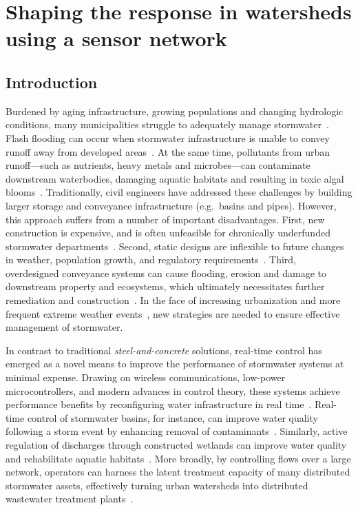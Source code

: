 \chapter{Shaping the response in watersheds using a sensor network}\label{ch:shaping}
\section{Introduction}

Burdened by aging infrastructure, growing populations and changing hydrologic conditions, many municipalities struggle to adequately manage stormwater~\cite{Kerkez_2016}.
Flash flooding can occur when stormwater infrastructure is unable to convey runoff away from developed areas~\cite{Wright_2017}.
At the same time, pollutants from urban runoff---such as nutrients, heavy metals and microbes---can contaminate downstream waterbodies, damaging aquatic habitats and resulting in toxic algal blooms~\cite{Kerkez_2016}. Traditionally, civil engineers have addressed these challenges by building larger storage and conveyance infrastructure (e.g.\ basins and pipes). However, this approach suffers from a number of important disadvantages. First, new construction is expensive, and is often unfeasible for chronically underfunded stormwater departments~\cite{Montestruque_2015}. Second, static designs are inflexible to future changes in weather, population growth, and regulatory requirements~\cite{Wright_2017}. Third, overdesigned conveyance systems can cause flooding, erosion and damage to downstream property and ecosystems, which ultimately necessitates further remediation and construction~\cite{Kerkez_2016}. In the face of increasing urbanization and more frequent extreme weather events~\cite{Bronstert_2002, stocker_2014}, new strategies are needed to ensure effective management of stormwater.

In contrast to traditional \textit{steel-and-concrete} solutions, real-time control has emerged as a novel means to improve the performance of stormwater systems at minimal expense. Drawing on wireless communications, low-power microcontrollers, and modern advances in control theory, these systems achieve performance benefits by reconfiguring water infrastructure in real time~\cite{Bartos_2018, Kerkez_2016}. Real-time control of stormwater basins, for instance, can improve water quality following a storm event by enhancing removal of contaminants~\cite{Kerkez_2016}. Similarly, active regulation of discharges through constructed wetlands can improve water quality and rehabilitate aquatic habitats~\cite{Mullapudi_2017, Bartos_2018}. More broadly, by controlling flows over a large network, operators can harness the latent treatment capacity of many distributed stormwater assets, effectively turning urban watersheds into distributed wastewater treatment plants~\cite{Bartos_2018, Kerkez_2016}.

